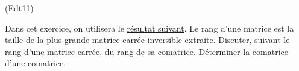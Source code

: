 \begin{tiny}(Edt11)\end{tiny}
Dans cet exercice, on utilisera le \href{http://back.maquisdoc.net/data/devoirs_nicolair/Argext.pdf}{résultat suivant}. \newline
Le rang d'une matrice est la taille de la plus grande matrice carrée inversible extraite.\newline
Discuter, suivant le rang d'une matrice carrée, du rang de sa comatrice. Déterminer la comatrice d'une comatrice.